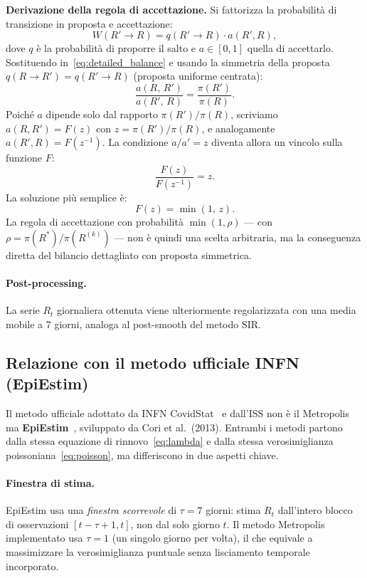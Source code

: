 \documentclass[12pt, a4paper]{article}
\begin{document}
\textbf{Derivazione della regola di accettazione.}
Si fattorizza la probabilità di transizione in proposta e accettazione:
\[
    W(R' \to R) = q(R' \to R)\cdot a(R', R),
\]
dove $q$ è la probabilità di proporre il salto e $a \in [0,1]$ quella di accettarlo.
Sostituendo in~\eqref{eq:detailed_balance} e usando la simmetria della proposta
$q(R \to R') = q(R' \to R)$ (proposta uniforme centrata):
\[
    \frac{a(R,\,R')}{a(R',\,R)} = \frac{\pi(R')}{\pi(R)}.
\]
Poiché $a$ dipende solo dal rapporto $\pi(R')/\pi(R)$, scriviamo $a(R,R') = F(z)$
con $z = \pi(R')/\pi(R)$, e analogamente $a(R',R) = F(z^{-1})$.
La condizione $a/a' = z$ diventa allora un vincolo sulla funzione $F$:
\[
    \frac{F(z)}{F(z^{-1})} = z.
\]
La soluzione più semplice è:
\begin{equation}
    F(z) = \min(1,\, z).
    \label{eq:Fmin}
\end{equation}
La regola di accettazione con probabilità $\min(1, \rho)$ — con $\rho = \pi(R^*)/\pi(R^{(k)})$
— non è quindi una scelta arbitraria, ma la conseguenza diretta del bilancio
dettagliato con proposta simmetrica.

\paragraph{Post-processing.}
La serie $R_t$ giornaliera ottenuta viene ulteriormente regolarizzata con una media mobile a 7
giorni, analoga al post-smooth del metodo SIR.

\subsection{Relazione con il metodo ufficiale INFN (EpiEstim)}
\label{sub:epiestim}

Il metodo ufficiale adottato da INFN CovidStat~\cite{INFN_rt_info} e dall'ISS non è il
Metropolis ma \textbf{EpiEstim}~\cite{Cori2013}, sviluppato da Cori et al.\ (2013).
Entrambi i metodi partono dalla stessa equazione di rinnovo~\eqref{eq:lambda} e dalla stessa
verosimiglianza poissoniana~\eqref{eq:poisson}, ma differiscono in due aspetti chiave.

\paragraph{Finestra di stima.}
EpiEstim usa una \emph{finestra scorrevole} di $\tau = 7$ giorni: stima $R_t$ dall'intero
blocco di osservazioni $[t-\tau+1, t]$, non dal solo giorno $t$.
Il metodo Metropolis implementato usa $\tau = 1$ (un singolo giorno per volta), il che
equivale a massimizzare la verosimiglianza puntuale senza lisciamento temporale incorporato.
\end{document}
